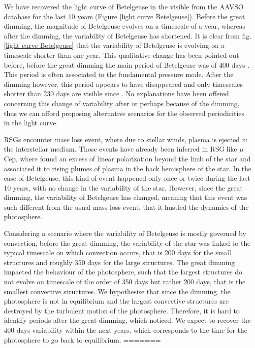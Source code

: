 \documentclass{aa}
\begin{document}
We have recovered the light curve of Betelgeuse in the visible from the AAVSO database for the last 10 years (Figure \ref{light curve Betelgeuse}).
Before the great dimming, the magnitude of Betelgeuse evolves on a timescale of a year, whereas after the dimming, the variability of Betelgeuse has shortened. 
It is clear from fig. \ref{light curve Betelgeuse} that the 
variability of Betelgeuse is evolving on a timescale shorter than one year. This qualitative change has been pointed out before,
before the great dimming the main period of Betelgeuse was of 400 days \citep{kiss_variability_2006}. 
This period is often associated to the fundamental pressure mode. After the dimming however, this period appears to have disappeared 
and only timescales shorter than 230 days are visible since \citep{dupree_great_2022}. 
No explanations have been offered concerning this change of variability after or perhaps because of the dimming, thus we can afford proposing alternative scenarios for the observed periodicities in the light curve. \

RSGs encounter mass loss event, where due to stellar winds, plasma is ejected in the interstellar medium. Those events have already been inferred in RSG like $\mu$Cep, where \cite{lopez_ariste_height_2023} found an excess of linear polarization beyond the limb of the star and associated it to rising plumes of plasma in the back hemisphere of the star. In the case of Betelgeuse, this kind of event happened only once or twice during the last 10 years, with no change in the variability of the star. However, since the great dimming, the variability of Betelgeuse has changed, meaning that this event was such different from the usual mass loss event, that it hustled the dynamics of the photosphere. \

Considering a scenario where the variability of Betelgeuse is mostly governed by convection, before the great dimming, the variability of the star was linked to the typical timescale on which convection occurs, that is 200 days for the small structures and roughly 350 days for the large structures. The great dimming impacted the behaviour of the photosphere, such that the largest structures do not evolve on timescale of the order of 350 days but rather 200 days, that is the smallest convective structures. We hypothesise that since the dimming, the photosphere is not in equilibrium and the largest convective structures are destroyed by the turbulent motion of the photosphere. Therefore, it is hard to identify periods after the great dimming, which \cite{dupree_great_2022} noticed. We expect to recover the 400 days variability within the next years, which corresponds to the time for the photosphere to go back to equilibrium.  
=======
\end{document}

